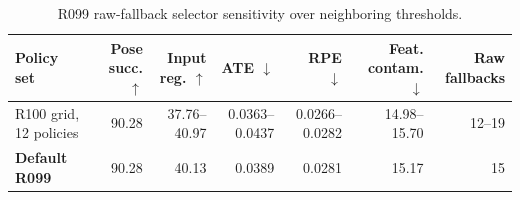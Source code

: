\begin{table}[t]
\centering
\small
\caption{R099 raw-fallback selector sensitivity over neighboring thresholds.}
\label{tab:aqua_r099_sensitivity}
\begin{tabular}{lrrrrrr}
\toprule
Policy set & Pose succ. $\uparrow$ & Input reg. $\uparrow$ & ATE $\downarrow$ & RPE $\downarrow$ & Feat. contam. $\downarrow$ & Raw fallbacks \\
\midrule
R100 grid, 12 policies & 90.28 & 37.76--40.97 & 0.0363--0.0437 & 0.0266--0.0282 & 14.98--15.70 & 12--19 \\
\textbf{Default R099} & 90.28 & 40.13 & 0.0389 & 0.0281 & 15.17 & 15 \\
\bottomrule
\end{tabular}
\end{table}
